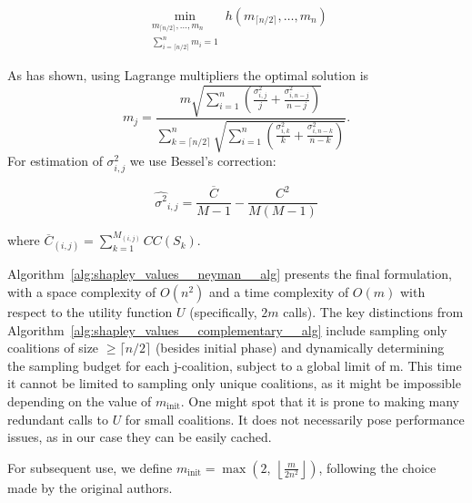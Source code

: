 \[
    \min_{\substack{m_{\lceil n/2 \rceil}, \dots, m_n \\ \sum_{i = \lceil n/2 \rceil}^{n} m_i = 1}}
    h(m_{\lceil n/2 \rceil}, \dots, m_n)
\]

\noindent As \textcite{shapleyapproximations} has shown, using Lagrange multipliers the optimal solution is
\begin{equation}
\label{equation:shapley_values__neyman__m}
    m_j = \frac{m \sqrt{\sum_{i=1}^{n} \left( \frac{\sigma_{i,j}^2}{j} + \frac{\sigma_{i,n-j}^2}{n-j} \right)}}{\sum_{k=\lceil n/2 \rceil}^{n} \sqrt{\sum_{i=1}^{n} \left( \frac{\sigma_{i,k}^2}{k} + \frac{\sigma_{i,n-k}^2}{n-k} \right)}}.
\end{equation}
For estimation of $\sigma_{i,j}^2$ we use Bessel's correction:

\begin{equation}
\label{equation:shapley_values__neyman__c}
    \hat{\sigma^2}_{i, j} = \frac{\overline{C}}{M - 1} - \frac{C^2}{M(M - 1)}
\end{equation}

\noindent where $\overline{C}_{(i, j)} = \sum_{k = 1}^{M_{(i, j)}} CC(S_k)$.

Algorithm~\ref{alg:shapley_values__neyman__alg} presents the final formulation, with a space complexity of $O(n^2)$ and a time complexity of $O(m)$ with respect to the utility function $U$ (specifically, $2m$ calls). The key distinctions from Algorithm~\ref{alg:shapley_values__complementary__alg} include sampling only coalitions of size $\ge \lceil n/2 \rceil$ (besides initial phase) and dynamically determining the sampling budget for each j-coalition, subject to a global limit of m. This time it cannot be limited to sampling only unique coalitions, as it might be impossible depending on the value of $m_{\text{init}}$. One might spot that it is prone to making many redundant calls to $U$ for small coalitions. It does not necessarily pose performance issues, as in our case they can be easily cached.

For subsequent use, we define $m_{\text{init}} = \max(2,\ \left\lfloor \frac{m}{2n^2} \right\rfloor)$, following the choice made by the original authors.

